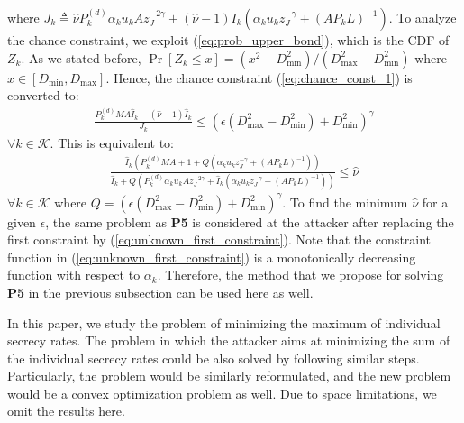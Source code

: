 \documentclass[draftclsnofoot, 12pt, onecolumn, journal]{IEEEtran}
\begin{document}
%
where $ J_k \triangleq \hat{\nu} P_k^{(d)} \alpha_k u_k A z_J^{-2 \gamma} + ( \hat{\nu} - 1 ) I_k (\alpha_k u_k z_J^{ -\gamma } + (A P_k L)^{-1} ) $.
To analyze the chance constraint, we exploit (\ref{eq:prob_upper_bond}), which is the CDF of $Z_k$.
As we stated before, $\Pr[Z_k \leq x] = (x^2 - D_{\mathrm{min}}^2)/ (D_{\mathrm{max}}^2 - D_{\mathrm{min}}^2)$ where $x \in [D_{\mathrm{min}}, D_{\mathrm{max}}]$.
Hence, the chance constraint (\ref{eq:chance_const_1}) is converted to:
%
\begin{align}
 \frac{P_k^{(d)} M A \hat{I}_k - (\hat{\nu} - 1) \hat{I}_k}{ J_k } \leq (\epsilon (D_{\mathrm{max}}^2 - D_{\mathrm{min}}^2) + D_{\mathrm{min}}^2)^{\gamma}
\end{align}
%
$\forall k \in \mathcal{K}$.
This is equivalent to:
%
\begin{align}
\frac{ \hat{I}_k ( P_k^{(d)} M A + 1 + Q (\alpha_k u_k z_J^{ -\gamma } + (A P_k L)^{-1} ) )}{\hat{I}_k + Q ( P_k^{(d)} \alpha_k u_k A z_J^{-2 \gamma} + \hat{I}_k (\alpha_k u_k z_J^{ -\gamma } + (A P_k L)^{-1} ) )} \leq \hat{\nu}
\label{eq:unknown_first_constraint}
\end{align}
%
$\forall k \in \mathcal{K}$ where $Q = (\epsilon (D_{\mathrm{max}}^2 - D_{\mathrm{min}}^2) + D_{\mathrm{min}}^2)^{\gamma}$.
To find the minimum $\hat{\nu}$ for a given $\epsilon$, the same problem as \textbf{P5} is considered at the attacker after replacing the first constraint by (\ref{eq:unknown_first_constraint}).
Note that the constraint function in (\ref{eq:unknown_first_constraint}) is a monotonically decreasing function with respect to $\alpha_k$.
Therefore, the method that we propose for solving \textbf{P5} in the previous subsection can be used here as well. 

In this paper, we study the problem of minimizing the maximum of individual secrecy rates.
The problem in which the attacker aims at minimizing the sum of the individual secrecy rates could be also solved by following similar steps. 
Particularly, the problem would be similarly reformulated, and the new problem would be a convex optimization problem as well.
Due to space limitations, we omit the results here.
 
\end{document}
